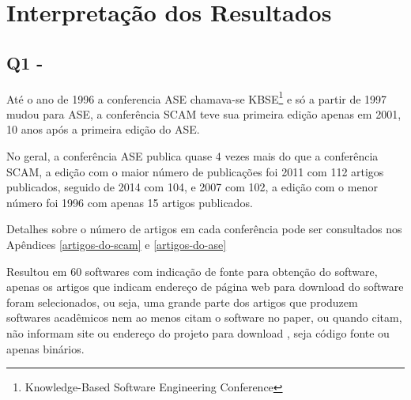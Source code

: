 


\section{Interpretação dos Resultados} \label{estudo1:interpretacao}

\subsection{Q1 - \EstudoUmQuestaoUm} %

Até o ano de 1996 a conferencia ASE chamava-se KBSE\footnote{ Knowledge-Based
Software Engineering Conference} e só a partir de 1997 mudou para ASE, a
conferência SCAM teve sua primeira edição apenas em 2001, 10 anos após a
primeira edição do ASE.

No geral, a conferência ASE publica quase 4 vezes mais do que a conferência
SCAM, a edição com o maior número de publicações foi 2011 com 112 artigos
publicados, seguido de 2014 com 104, e 2007 com 102, a edição com o menor
número foi 1996 com apenas 15 artigos publicados.

Detalhes sobre o número de artigos
em cada conferência pode ser consultados nos Apêndices
\ref{artigos-do-scam} e \ref{artigos-do-ase} 



Resultou em 60 softwares com indicação de fonte para obtenção do
software, apenas os artigos que indicam endereço de página web para download do
software foram selecionados, ou seja, uma grande parte dos artigos que produzem
softwares acadêmicos nem ao menos citam o software no paper, ou quando citam,
não informam site ou endereço do projeto para download
\cite{allen2017engineering}, seja código fonte ou apenas binários.


